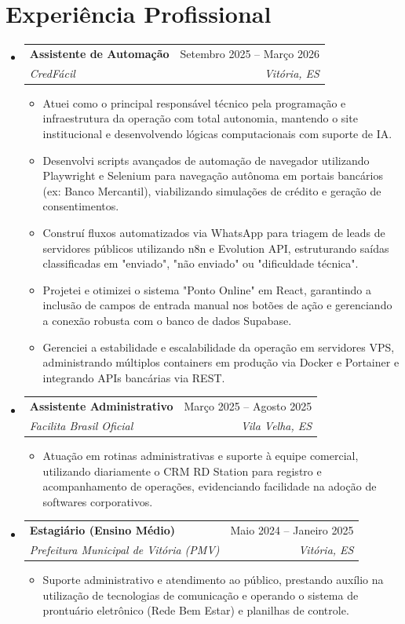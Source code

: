 \documentclass[letterpaper,11pt]{article}
\makeatletter
\newcommand{\resumeItem}[1]{
  \item\small{
    {#1 \vspace{-2pt}}
  }
}
\newcommand{\resumeSubheading}[4]{
  \vspace{-2pt}\item
    \begin{tabular*}{0.97\textwidth}[t]{l@{\extracolsep{\fill}}r}
      \textbf{#1} & #2 \\
      \textit{\small#3} & \textit{\small #4} \\
    \end{tabular*}\vspace{-7pt}
}
\newcommand{\resumeSubHeadingListStart}{\begin{itemize}[leftmargin=0.15in, label={}]}
\newcommand{\resumeSubHeadingListEnd}{\end{itemize}}
\newcommand{\resumeItemListStart}{\begin{itemize}}
\newcommand{\resumeItemListEnd}{\end{itemize}\vspace{-5pt}}
\makeatother
\begin{document}
\section{Experiência Profissional}
  \resumeSubHeadingListStart

    \resumeSubheading
      {Assistente de Automação}{Setembro 2025 -- Março 2026}
      {CredFácil}{Vitória, ES}
      \resumeItemListStart
        \resumeItem{Atuei como o principal responsável técnico pela programação e infraestrutura da operação com total autonomia, mantendo o site institucional e desenvolvendo lógicas computacionais com suporte de IA.}
        \resumeItem{Desenvolvi scripts avançados de automação de navegador utilizando Playwright e Selenium para navegação autônoma em portais bancários (ex: Banco Mercantil), viabilizando simulações de crédito e geração de consentimentos.}
        \resumeItem{Construí fluxos automatizados via WhatsApp para triagem de leads de servidores públicos utilizando n8n e Evolution API, estruturando saídas classificadas em "enviado", "não enviado" ou "dificuldade técnica".}
        \resumeItem{Projetei e otimizei o sistema "Ponto Online" em React, garantindo a inclusão de campos de entrada manual nos botões de ação e gerenciando a conexão robusta com o banco de dados Supabase.}
        \resumeItem{Gerenciei a estabilidade e escalabilidade da operação em servidores VPS, administrando múltiplos containers em produção via Docker e Portainer e integrando APIs bancárias via REST.}
      \resumeItemListEnd

    \resumeSubheading
      {Assistente Administrativo}{Março 2025 -- Agosto 2025}
      {Facilita Brasil Oficial}{Vila Velha, ES}
      \resumeItemListStart
        \resumeItem{Atuação em rotinas administrativas e suporte à equipe comercial, utilizando diariamente o CRM RD Station para registro e acompanhamento de operações, evidenciando facilidade na adoção de softwares corporativos.}
      \resumeItemListEnd

    \resumeSubheading
      {Estagiário (Ensino Médio)}{Maio 2024 -- Janeiro 2025}
      {Prefeitura Municipal de Vitória (PMV)}{Vitória, ES}
      \resumeItemListStart
        \resumeItem{Suporte administrativo e atendimento ao público, prestando auxílio na utilização de tecnologias de comunicação e operando o sistema de prontuário eletrônico (Rede Bem Estar) e planilhas de controle.}
      \resumeItemListEnd

  \resumeSubHeadingListEnd

\end{document}
